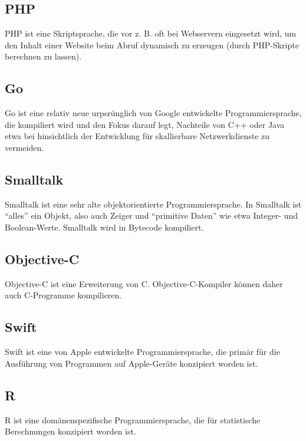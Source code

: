 \begin{multicols}{3}
\subsection{PHP}
PHP ist eine Skriptsprache, die vor z. B. oft bei Webservern eingesetzt wird, um den Inhalt einer Website beim Abruf dynamisch zu erzeugen (durch PHP-Skripte berechnen zu lassen).
\subsection{Go}
Go ist eine relativ neue urpsrünglich von Google entwickelte Programmiersprache, die kompiliert wird und den Fokus darauf legt, Nachteile von C++ oder Java etwa bei hinsichtlich der Entwicklung für skallierbare Netzwerkdienste zu vermeiden.
\subsection{Smalltalk}
Smalltalk ist eine sehr alte objektorientierte Programmiersprache. In Smalltalk ist \enquote{alles} ein Objekt, also auch Zeiger und \enquote{primitive Daten} wie etwa Integer- und Boolean-Werte. Smalltalk wird in Bytecode kompiliert.
\subsection{Objective-C}
Objective-C ist eine Erweiterung von C. Objective-C-Kompiler können daher auch C-Programme kompilieren.
\subsection{Swift}
Swift ist eine von Apple entwickelte Programmiersprache, die primär für die Ausführung von Programmen auf Apple-Geräte konzipiert worden ist.
\subsection{R}
R ist eine domänenspezifische Programmiersprache, die für statistische Berechnungen konzipiert worden ist.
\end{multicols}

